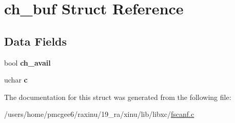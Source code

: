 \hypertarget{structch__buf}{\section{ch\-\_\-buf Struct Reference}
\label{structch__buf}
}
\subsection*{Data Fields}
\begin{DoxyCompactItemize}
\item 
\hypertarget{structch__buf_a239b6ef547e64f2c15d518adcf003427}{bool {\bfseries ch\-\_\-avail}}\label{structch__buf_a239b6ef547e64f2c15d518adcf003427}

\item 
\hypertarget{structch__buf_a4220fab5ac834c58b5b6291fc1a05866}{uchar {\bfseries c}}\label{structch__buf_a4220fab5ac834c58b5b6291fc1a05866}

\end{DoxyCompactItemize}


The documentation for this struct was generated from the following file\-:\begin{DoxyCompactItemize}
\item 
/users/home/pmcgee6/raxinu/19\-\_\-ra/xinu/lib/libxc/\hyperlink{fscanf_8c}{fscanf.\-c}\end{DoxyCompactItemize}
